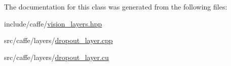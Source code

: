 The documentation for this class was generated from the following files\+:\begin{DoxyCompactItemize}
\item 
include/caffe/\hyperlink{vision__layers_8hpp}{vision\+\_\+layers.\+hpp}\item 
src/caffe/layers/\hyperlink{dropout__layer_8cpp}{dropout\+\_\+layer.\+cpp}\item 
src/caffe/layers/\hyperlink{dropout__layer_8cu}{dropout\+\_\+layer.\+cu}\end{DoxyCompactItemize}
